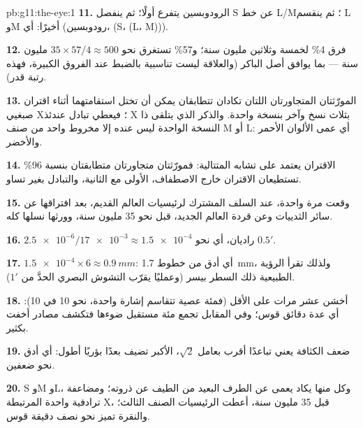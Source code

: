 \begin{solution}{pb:g11:the-eye:1}
\textbf{11.} الرودوبسين يتفرع أولًا؛ ثم ينفصل S عن خط L/M؛ ثم ينقسم L
وM أخيرًا: أي (رودوبسين، (S، (L، M))).

\textbf{12.} فرق 4\% لخمسة وثلاثين مليون سنة؛ و57\% تستغرق نحو
$35 \times 57/4 \approx 500$ مليون سنة --- بما يوافق أصل 
الباكر (والعلاقة ليست تناسبية بالضبط عند الفروق الكبيرة، فهذه رتبة
قدر).

\textbf{13.} المورّثتان المتجاورتان اللتان تكادان تتطابقان يمكن أن
تختل استقامتهما أثناء اقتران صبغيي X؛ فيعطي تبادل عندئذ  X بثلاث
نسخ وآخر بنسخة واحدة. والذكر الذي يتلقى  ذا النسخة الواحدة ليس
عنده إلا مخروط واحد من صنف M أو L: أي عمى الألوان الأحمر والأخضر.

\textbf{14.} الاقتران يعتمد على تشابه المتتالية: فمورّثتان متجاورتان
متطابقتان بنسبة 96\% تستطيعان الاقتران خارج الاصطفاف، الأولى مع
الثانية، والتبادل بغير تساو.

\textbf{15.} وقعت مرة واحدة، عند السلف المشترك لرئيسيات العالم القديم،
بعد افتراقها عن سائر الثدييات وعن قردة العالم الجديد، قبل نحو 35 مليون
سنة، وورثها نسلها كله.

\textbf{16.} $\num{2.5e-6}/\num{17e-3} \approx \num{1.5e-4}$ راديان،
أي نحو $0.5'$.

\textbf{17.} $\num{1.5e-4} \times 6 \approx \qty{0.9}{mm}$: أي أدق من
خطوط \qty{1.7}{mm}، ولذلك تقرأ الرؤية الطبيعية ذلك السطر بيسر (وعمليًا
يقرّب التشوش البصري الحدَّ من $1'$).

\textbf{18.} أخشن عشر مرات على الأقل (فمئة عصية تتقاسم إشارة واحدة،
نحو 10 في 10): أي عدة دقائق قوس؛ وفي المقابل تجمع مئة مستقبل ضوءها
فتكشف مصادر أخفت بكثير.

\textbf{19.} ضعف الكثافة يعني تباعدًا أقرب بعامل $\sqrt{2}$، 
الأكبر تضيف بعدًا بؤريًا أطول: أي أدق نحو ضعفين.

\textbf{20.}  S وM وL، وكل منها يكاد يعمى عن الطرف البعيد من
الطيف عن ذروته؛ ومضاعفة ترادفية واحدة   المرتبطة
 X، قبل 35 مليون سنة، أعطت الرئيسيات الصنف الثالث؛ والنقرة
تميز نحو نصف دقيقة قوس.
\end{solution}
